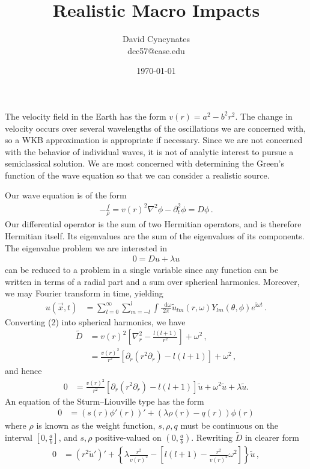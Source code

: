 \documentclass{article}
\title{Realistic Macro Impacts}
\author{David Cyncynates \\ dcc57@case.edu}
\date{\today}
\newcommand*\diff{\mathop{}\!\mathrm{d}}
\newcommand*\te[1]{\text{#1}}
\newcommand*\p[1]{\left(#1\right)}
\newcommand*\ps[1]{\left[#1\right]}
\newcommand*\pc[1]{\left\{#1\right\}}
\newcommand*\f[2]{\frac{#1}{#2}}
\newcommand*\I{\te{i}}
\begin{document}
\maketitle
The velocity field in the Earth has the form $v(r)=a^2-b^2r^2$. The change in velocity occurs over several wavelengths of the oscillations we are concerned with, so a WKB approximation is appropriate if necessary. Since we are not concerned with the behavior of individual waves, it is not of analytic interest to pursue a semiclassical solution. We are most concerned with determining the Green's function of the wave equation so that we can consider a realistic source.

Our wave equation is of the form
\begin{align}
-\f f\rho=v(r)^2\nabla^2\phi-\partial_t^2\phi=D\phi\,.
\end{align}
Our differential operator is the sum of two Hermitian operators, and is therefore Hermitian itself. Its eigenvalues are the sum of the eigenvalues of its components. The eigenvalue problem we are interested in
\begin{align}
0=D u+\lambda u
\end{align}
can be reduced to a problem in a single variable since any function can be written in terms of a radial part and a sum over spherical harmonics. Moreover, we may Fourier transform in time, yielding
\begin{align}
u(\vec x,t)&=\sum_{l=0}^{\infty}\sum_{m=-l}^l\int\f{\diff\omega}{2\pi}\tilde u_{lm}(r,\omega)Y_{lm}(\theta,\phi)e^{\I\omega t}\,.
\end{align}
Converting (2) into spherical harmonics, we have
\begin{align}
\tilde D&=v(r)^2\ps{\nabla^2_r-\f{l(l+1)}{r^2}}+\omega^2\,,\\
&=\f{v(r)^2}{r^2}\ps{\partial_r(r^2\partial_r)-l(l+1)}+\omega^2\,,
\end{align}
and hence
\begin{align}
0&=\f{v(r)^2}{r^2}\ps{\partial_r(r^2\partial_r)-l(l+1)}\tilde u+\omega^2\tilde u+\lambda\tilde u.
\end{align}
An equation of the Sturm--Liouville type has the form
\begin{align}
0&=(s(r)\phi'(r))'+\p{\lambda\rho(r)-q(r)}\phi(r)
\end{align}
where $\rho$ is known as the weight function, $s,\rho,q$ must be continuous on the interval $[0,\f ab]$, and $s,\rho$ positive-valued on $(0,\f ab)$. Rewriting $\tilde D$ in clearer form
\begin{align}
0&=(r^2\tilde u')'+\pc{\lambda\f{r^2}{v(r)^2}-\ps{l(l+1)-\f{r^2}{v(r)^2}\omega^2}}\tilde u\,,
\end{align}
\end{document}
